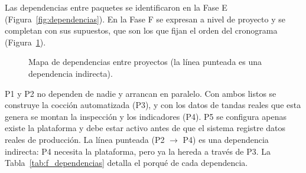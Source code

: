 Las dependencias entre paquetes se identificaron en la Fase E (Figura~\ref{fig:dependencias}). En la Fase F se expresan a nivel de proyecto y se completan con sus supuestos, que son los que fijan el orden del cronograma (Figura~\ref{fig:f_dependencias}).

\begin{figure}[H]
  \centering
  \caption{Mapa de dependencias entre proyectos (la línea punteada es una dependencia indirecta).}
  \label{fig:f_dependencias}
\end{figure}

P1 y P2 no dependen de nadie y arrancan en paralelo. Con ambos listos se construye la cocción automatizada (P3), y con los datos de tandas reales que esta genera se montan la inspección y los indicadores (P4). P5 se configura apenas existe la plataforma y debe estar activo antes de que el sistema registre datos reales de producción. La línea punteada (P2 $\rightarrow$ P4) es una dependencia indirecta: P4 necesita la plataforma, pero ya la hereda a través de P3. La Tabla~\ref{tab:f_dependencias} detalla el porqué de cada dependencia.

